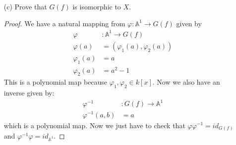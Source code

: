 \documentclass{article}
\begin{document}
\begin{itemize}
\begin{proof}
                    Now if $p = (x_{0}, y_{0}) \in V((x^{2} - 1 - y))$, then we require:
                        \begin{equation*}
                            x_{0}^{2} - 1 - y_{0} = 0
                        \end{equation*}
                    or
                        \begin{equation*}
                            y_{0} = x_{0}^{2} - 1
                        \end{equation*}
                    therefore, $p = (x_{0}, x_{0}^{2} - 1) \in G(f)$. So $G(f) = V(x^{2} - 1 - y)$.
                \end{proof}

            \item [(c)] Prove that $G(f)$ is isomorphic to $X$.
                \begin{proof}
                    We have a natural mapping from $\varphi : \mathbb{A}^{1} \rightarrow G(f)$ given by 
                        \begin{align*}
                            \varphi        &: \mathbb{A}^{1} \rightarrow G(f)  \\
                            \varphi(a)     &= (\varphi_{1}(a), \varphi_{2}(a)) \\
                            \varphi_{1}(a) &= a                                \\
                            \varphi_{2}(a) &= a^{2} - 1                          
                        \end{align*}
                    This is a polynomial map because $\varphi_{1}, \varphi_{2} \in k[x]$. Now we also have an inverse given by:
                        \begin{align*}
                            \varphi^{-1}       &: G(f) \rightarrow \mathbb{A}^{1} \\
                            \varphi^{-1}(a, b) &= a                                 
                        \end{align*}
                    which is a polynomial map. Now we just have to check that $\varphi\varphi^{-1} = id_{G(f)}$ and $\varphi^{-1}\varphi = id_{\mathbb{A}^{1}}$. 


\end{proof}
\end{itemize}
\end{document}
